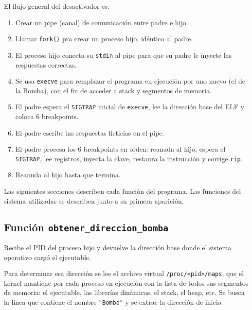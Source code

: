 \documentclass[10pt,a4paper]{article}
\begin{document}
El flujo general del desactivador es:
\begin{enumerate}[label=\arabic*.]
    \item Crear un pipe (canal) de comunicación entre padre e hijo.
    \item Llamar \texttt{fork()} pra crear un proceso hijo, idéntico al padre.
    \item El proceso hijo conecta su \texttt{stdin} al pipe para que su padre le inyecte las respuestas correctas.
    \item Se usa \texttt{execve} para remplazar el programa en ejecución por uno nuevo (el de la Bomba), con el fin de acceder a stack y segmentos de memoria.
    \item El padre espera el \texttt{SIGTRAP} inicial de \texttt{execve}, lee la dirección base del ELF y coloca 6 breakpoints.
    \item El padre escribe las respuestas ficticias en el pipe.
    \item El padre procesa los 6 breakpoints en orden: reanuda al hijo, espera el \texttt{SIGTRAP}, lee registros, inyecta la clave, restaura la instrucción y corrige \texttt{rip}.
    \item Reanuda al hijo hasta que termina.
\end{enumerate}

Las siguientes secciones describen cada función del programa. Las funciones del sistema utilizadas se describen junto a su primera aparición.

\subsection{Función \texttt{obtener\_direccion\_bomba}}

Recibe el PID del proceso hijo y devuelve la dirección base donde el sistema operativo cargó el ejecutable.

Para determinar esa dirección se lee el archivo virtual \texttt{/proc/<pid>/maps}, que el kernel mantiene por cada proceso en ejecución con la lista de todos sus segmentos de memoria: el ejecutable, las librerías dinámicas, el stack, el heap, etc. Se busca la línea que contiene el nombre \texttt{"Bomba"} y se extrae la dirección de inicio.
\end{document}
